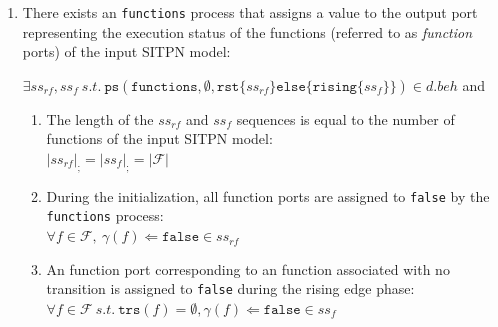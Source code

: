\begin{definition}
\begin{enumerate}[resume]
\begin{enumerate}
      \end{enumerate}

    \item\label{it:functions} There exists an \texttt{functions}
      process that assigns a value to the output port representing the
      execution status of the functions (referred to as
      \textit{function} ports) of the input SITPN model:
    
      $\exists{}ss_{rf},ss_{f}~s.t.~\mathtt{ps}(\mathtt{functions},\emptyset,\mathtt{rst}\{ss_{rf}\}\mathtt{else}\{\mathtt{rising}\{ss_f\}\})\in{}d.beh$
      and
    \begin{enumerate}
    \item The length of the $ss_{rf}$ and $ss_{f}$ sequences is equal
      to the number of functions of the input SITPN model:\\
      $\vert{}ss_{rf}\vert_{;}=\vert{}ss_f\vert_{;}=\vert\mathcal{F}\vert$
      
    \item During the initialization, all function ports are assigned
      to
      \texttt{false} by the \texttt{functions} process:\\
      $\forall{}f\in\mathcal{F},~\gamma(f)\Leftarrow\mathtt{false}\in{}ss_{rf}$
      
    \item An function port corresponding to an function associated
      with no transition is assigned to \texttt{false} during the
      rising edge
      phase:\\
      $\forall{}f\in\mathcal{F}~s.t.~\mathtt{trs}(f)=\emptyset,\gamma(f)\Leftarrow\mathtt{false}\in{}ss_{f}$
      

\end{enumerate}
\end{enumerate}
\end{definition}
